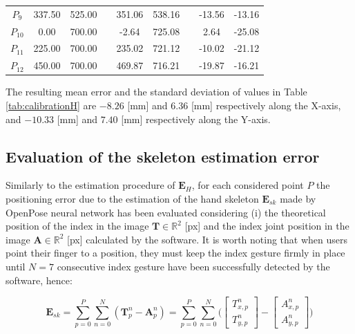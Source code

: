 \documentclass[a4paper, 10 pt, conference]{ieeeconf}      %
\begin{document}
\begin{table}[h!]
\begin{adjustbox}{max width=\columnwidth}
\begin{tabular}{ccccccccc}
                                $P_9$               & 337.50           & 525.00               &  & 351.06                    & 538.16                &  & -13.56               & -13.16   \\
                                $P_{10}$          & 0.00               & 700.00               &  & -2.64                      & 725.08                &  & 2.64                  & -25.08   \\
                                $P_{11}$          & 225.00           & 700.00               &  & 235.02                    & 721.12                &  & -10.02               & -21.12   \\
                                $P_{12}$          & 450.00           & 700.00               &  & 469.87                    & 716.21                &  & -19.87               & -16.21   \\  \bottomrule
		\end{tabular}%
	\end{adjustbox}
\end{table}

The resulting mean error and the standard deviation of values in Table \ref{tab:calibrationH} are $-8.26$ [mm] and $6.36$ [mm] respectively along the X-axis, and $-10.33$ [mm] and $7.40$ [mm] respectively along the Y-axis.

\subsection{Evaluation of the skeleton estimation error}

Similarly to the estimation procedure of $\mathbf{E}_H$, for each considered point $P$ the positioning error due to the estimation of the hand skeleton $\mathbf{E}_{sk}$ made by OpenPose neural network has been evaluated considering (i) the theoretical position of the index in the image $\mathbf{T} \in \mathbb{R}^2$ [px] and the index joint position in the image $\mathbf{A} \in \mathbb{R}^2$ [px] calculated by the software. It is worth noting that when users point their finger to a position, they must keep the index gesture firmly in place until $N = 7$ consecutive index gesture have been successfully detected by the software, hence:

\begin{equation}
\mathbf{E}_{sk} = \sum_{p = 0}^P \sum_{n = 0}^N (\mathbf{T}^n_p - \mathbf{A}^n_p) =
\sum_{p = 0}^{P} \sum_{n = 0}^N \bigg( \begin{bmatrix}
T^n_{x,p}\\
T^n_{y,p}
\end{bmatrix}-
\begin{bmatrix}
A^n_{x,p}\\
A^n_{y,p}
\end{bmatrix} \bigg)
\end{equation}
\end{document}
